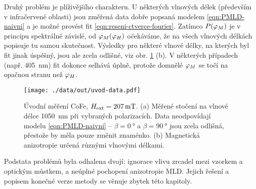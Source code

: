 Druhý problém je plíživějšího charakteru.
U některých vlnových délek (především v infračervené oblasti) jsou změřená data dobře popsaná modelem \eqref{eqn:PMLD-naivni} a je možné provést fit \eqref{eqn:reseni-ctverce-fourier}.
Zatímco $P(\varphi_M)$ je v principu spektrálně závislé, od $\varphi_M(\varphi_H)$ očekáváme, že na všech vlnových délkách popisuje tu samou skutečnost.
Výsledky pro některé vlnové délky, na kterých byl fit jinak úspěšný, jsou ale zcela odlišné, viz obr. \ref{fig:g-uvod-data} (b).
V některých případech (např. \SI{405}{\nano\meter}) fit dokonce selhává úplně, protože domnělé $\varphi_M$ se točí na opačnou stranu než $\varphi_H$.

\begin{figure}[htbp]
    \centering
    \texttt{[image: ./data/out/uvod-data.pdf]}
    \caption{Úvodní měření CoFe, $H_\textrm{ext}=\SI{207}{\milli\tesla}$. (a) Měřené stočení na vlnové délce \SI{1050}{\nano\meter} při vybraných polarizacích. Data neodpovídají modelu \eqref{eqn:PMLD-naivni} -- $\beta=\SI{0}{\degree}$ a $\beta=\SI{90}{\degree}$ jsou zcela odlišná, přestože by měla pouze změnit znaménko. (b) Magnetická anizotropie určená různými vlnovými délkami.}
    \label{fig:g-uvod-data}
\end{figure}

Podstata problémů byla odhalena dvojí: ignorace vlivu zrcadel mezi vzorkem a optickým můstkem, a neúplné pochopení anizotropie MLD.
Jejich řešení a popisem konečné verze metody se věnuje zbytek této kapitoly.
